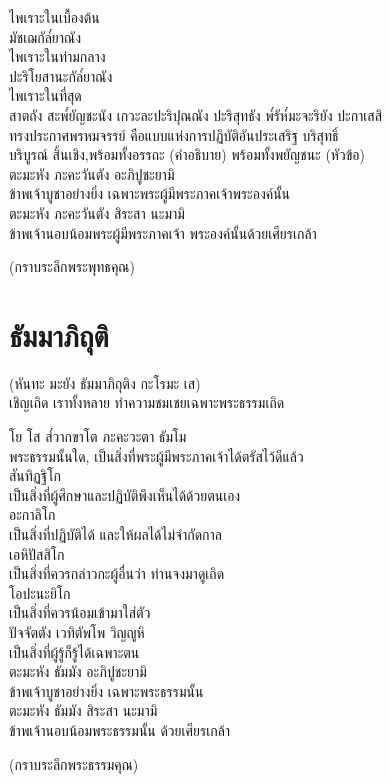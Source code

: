 \documentclass{article}
\begin{document}
\indent ไพเราะในเบื้องต้น\\
มัชเฌกัล๎ยาณัง\\
\indent ไพเราะในท่ามกลาง\\
ปะริโยสานะกัล๎ยาณัง\\
\indent ไพเราะในที่สุด\\
สาตถัง สะพ๎ยัญชะนัง เกวะละปะริปุณณัง ปะริสุทธัง พ๎รัห๎มะจะริยัง ปะกาเสสิ\\
\indent ทรงประกาศพรหมจรรย์ คือแบบแห่งการปฏิบัติอันประเสริฐ บริสุทธิ์\\
บริบูรณ์ สิ้นเชิง,พร้อมทั้งอรรถะ (คำอธิบาย) พร้อมทั้งพยัญชนะ (หัวข้อ)\\
ตะมะหัง ภะคะวันตัง อะภิปูชะยามิ\\
\indent ข้าพเจ้าบูชาอย่างยิ่ง เฉพาะพระผู้มีพระภาคเจ้าพระองค์นั้น\\
ตะมะหัง ภะคะวันตัง สิระสา นะมามิ\\
\indent ข้าพเจ้านอบน้อมพระผู้มีพระภาคเจ้า พระองค์นั้นด้วยเศียรเกล้า\\
\begin{center}
(กราบระลึกพระพุทธคุณ)
\end{center}
\pagebreak
\section{ธัมมาภิถุติ}
\begin{center}
(หันทะ มะยัง ธัมมาภิถุติง กะโรมะ เส)\\
เชิญเถิด เราทั้งหลาย ทำความชมเชยเฉพาะพระธรรมเถิด
\end{center}
โย โส ส๎วากขาโต ภะคะวะตา ธัมโม\\
\indent พระธรรมนั้นใด, เป็นสิ่งที่พระผู้มีพระภาคเจ้าได้ตรัสไว้ดีแล้ว\\
สันทิฏฐิโก\\
\indent เป็นสิ่งที่ผู้ศึกษาและปฏิบัติพึงเห็นได้ด้วยตนเอง\\
อะกาลิโก\\
\indent เป็นสิ่งที่ปฏิบัติได้ และให้ผลได้ไม่จำกัดกาล\\
เอหิปัสสิโก\\
\indent เป็นสิ่งที่ควรกล่าวกะผู้อื่นว่า ท่านจงมาดูเถิด\\
โอปะนะยิโก\\
\indent เป็นสิ่งที่ควรน้อมเข้ามาใส่ตัว\\
ปัจจัตตัง เวทิตัพโพ วิญญูหิ\\
\indent เป็นสิ่งที่ผู้รู้ก็รู้ได้เฉพาะตน\\
ตะมะหัง ธัมมัง อะภิปูชะยามิ\\
\indent ข้าพเจ้าบูชาอย่างยิ่ง เฉพาะพระธรรมนั้น\\
ตะมะหัง ธัมมัง สิระสา นะมามิ\\
\indent ข้าพเจ้านอบน้อมพระธรรมนั้น ด้วยเศียรเกล้า
\begin{center}
(กราบระลึกพระธรรมคุณ)
\end{center}
\pagebreak
\end{document}
